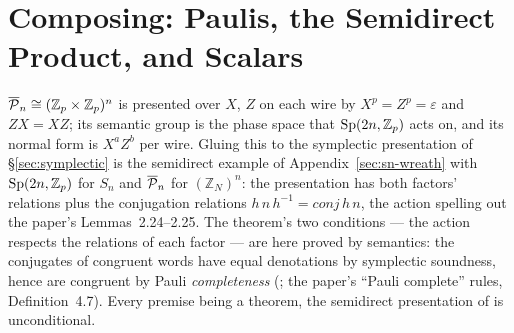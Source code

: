 \section{Composing: Paulis, the Semidirect Product, and Scalars}\label{sec:composing}

$\overline{\mathcal{P}}_{n} \cong (\mathbb{Z}_p \times \mathbb{Z}_p)^n$ is presented over $X$, $Z$ on each
wire by $X^{p} = Z^{p} = \varepsilon$ and $ZX = XZ$; its semantic
group is the phase space that $\mathrm{Sp}(2n,\mathbb{Z}_p)$ acts on, and its normal form is
$X^{a}Z^{b}$ per wire.  Gluing this to the symplectic presentation of
\S\ref{sec:symplectic} is the semidirect example of
Appendix~\ref{sec:sn-wreath} with $\mathrm{Sp}(2n,\mathbb{Z}_p)$ for $S_n$ and $\overline{\mathcal{P}}_{n}$ for
$(\mathbb{Z}_N)^n$: the presentation has both factors' relations plus
the conjugation relations $h\,n\,h^{-1} = \mathit{conj}\,h\,n$, the
action  spelling out the paper's Lemmas~2.24--2.25.  The
theorem's two conditions --- the action respects the relations of
each factor --- are here proved by semantics: the conjugates of
congruent words have equal denotations by symplectic soundness, hence
are congruent by Pauli \emph{completeness} (; the
paper's ``Pauli complete'' rules, Definition~4.7).  Every premise
being a theorem, the semidirect presentation of  is
unconditional.

